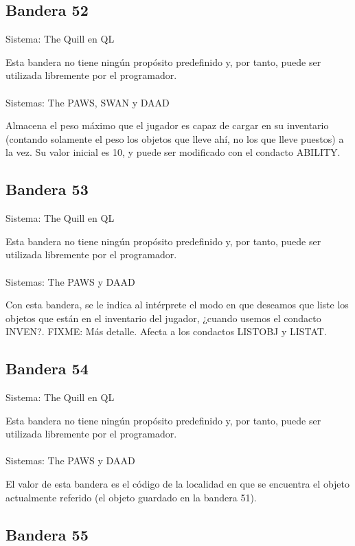 \documentclass[11pt, a5paper]{article}
\newcommand{\quill}{\textsf{The Quill}\xspace}
\newcommand{\paw}{\textsf{The PAWS}\xspace}
\newcommand{\swan}{\textsf{SWAN}\xspace}
\newcommand{\daad}{\textsf{DAAD}\xspace}
\newcommand{\sistema}[1]{\noindent Sistema: #1 \nopagebreak}
\newcommand{\sistemas}[1]{\noindent Sistemas: #1 \nopagebreak}
\begin{document}
\subsection{Bandera 52}

\sistema{\quill en QL}

Esta bandera no tiene ningún propósito predefinido y, por tanto, puede ser utilizada libremente por el programador.
\\\ \\
\sistemas{\paw, \swan y \daad}

Almacena el peso máximo que el jugador es capaz de cargar en su inventario (contando solamente el peso los objetos que lleve ahí, no los que lleve puestos) a la vez. Su valor inicial es 10, y puede ser modificado con el condacto ABILITY.

\subsection{Bandera 53}

\sistema{\quill en QL}

Esta bandera no tiene ningún propósito predefinido y, por tanto, puede ser utilizada libremente por el programador.
\\\ \\
\sistemas{\paw y \daad}

Con esta bandera, se le indica al intérprete el modo en que deseamos que liste los objetos que están en el inventario del jugador, ¿cuando usemos el condacto INVEN?. FIXME: Más detalle. Afecta a los condactos LISTOBJ y LISTAT.

\subsection{Bandera 54}

\sistema{\quill en QL}

Esta bandera no tiene ningún propósito predefinido y, por tanto, puede ser utilizada libremente por el programador.
\\\ \\
\sistemas{\paw y \daad}

El valor de esta bandera es el código de la localidad en que se encuentra el objeto actualmente referido (el objeto guardado en la bandera 51).

\subsection{Bandera 55}
\end{document}

